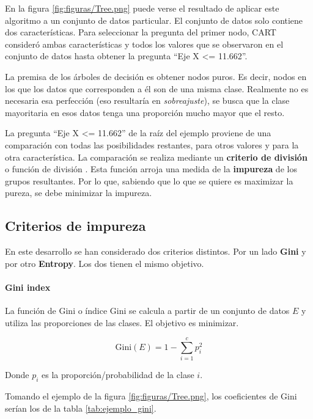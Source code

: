
\medskip
En la figura \ref{fig:figuras/Tree.png} puede verse el resultado de aplicar este algoritmo a un conjunto de datos particular. El conjunto de datos solo contiene dos características. Para seleccionar la pregunta del primer nodo, CART consideró ambas características y todos los valores que se observaron en el conjunto de datos hasta obtener la pregunta ``Eje X <= 11.662''.


La premisa de los árboles de decisión es obtener nodos puros. Es decir, nodos en los que los datos que corresponden a él son de una misma clase. Realmente no es necesaria esa perfección (eso resultaría en \textit{sobreajuste}), se busca que la clase mayoritaria en esos datos tenga una proporción mucho mayor que el resto.

La pregunta ``Eje X <= 11.662'' de la raíz del ejemplo proviene de una comparación con todas las posibilidades restantes, para otros valores y para la otra característica.  La comparación se realiza mediante un \textbf{criterio de división} o función de división \cite{lewis2000introduction}. Esta función arroja una medida de la \textbf{impureza} de los grupos resultantes. Por lo que, sabiendo que lo que se quiere es maximizar la pureza, se debe minimizar la impureza.

\subsection{Criterios de impureza}

En este desarrollo se han considerado dos criterios distintos. Por un lado \textbf{Gini} y por otro \textbf{Entropy}. Los dos tienen el mismo objetivo.

\paragraph{Gini index} La función de Gini o índice Gini se calcula a partir de un conjunto de datos $E$ y utiliza las proporciones de las clases. El objetivo es minimizar.

\begin{equation}
\text{Gini}(E) = 1 - \sum_{i=1}^{c} p_{i}^{2}
\end{equation}

Donde $p_i$ es la proporción/probabilidad de la clase $i$.\newline

Tomando el ejemplo de la figura \ref{fig:figuras/Tree.png}, los coeficientes de Gini serían los de la tabla \ref{tab:ejemplo_gini}.


